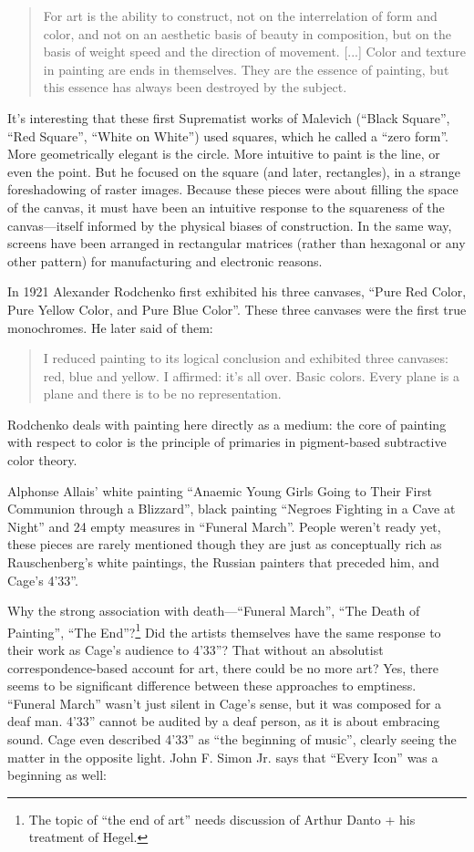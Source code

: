 \documentclass{thesis}
\begin{document}
	\begin{quote}
	For art is the ability to construct, not on the interrelation of form and color, and not on an aesthetic basis of beauty in composition, but on the basis of weight speed and the direction of movement. [...] Color and texture in painting are ends in themselves. They are the essence of painting, but this essence has always been destroyed by the subject.
	\end{quote}
	
It's interesting that these first Suprematist works of Malevich (``Black Square'', ``Red Square'', ``White on White'') used squares, which he called a ``zero form''. More geometrically elegant is the circle. More intuitive to paint is the line, or even the point. But he focused on the square (and later, rectangles), in a strange foreshadowing of raster images. Because these pieces were about filling the space of the canvas, it must have been an intuitive response to the squareness of the canvas---itself informed by the physical biases of construction. In the same way, screens have been arranged in rectangular matrices (rather than hexagonal or any other pattern) for manufacturing and electronic reasons.
	
	\cite{moma_rodchenko_1998}
	In 1921 Alexander Rodchenko first exhibited his three canvases, ``Pure Red Color, Pure Yellow Color, and Pure Blue Color''. These three canvases were the first true monochromes. He later said of them:
	
	\begin{quote}
	I reduced painting to its logical conclusion and exhibited three canvases: red, blue and yellow. I affirmed: it's all over. Basic colors. Every plane is a plane and there is to be no representation.
	\end{quote}
	
Rodchenko deals with painting here directly as a medium: the core of painting with respect to color is the principle of primaries in pigment-based subtractive color theory.
	
Alphonse Allais' white painting ``Anaemic Young Girls Going to Their First Communion through a Blizzard'', black painting ``Negroes Fighting in a Cave at Night'' and 24 empty measures in ``Funeral March''. People weren't ready yet, these pieces are rarely mentioned though they are just as conceptually rich as Rauschenberg's white paintings, the Russian painters that preceded him, and Cage's 4'33''.
	
Why the strong association with death---``Funeral March'', ``The Death of Painting'', ``The End''?\footnote{The topic of ``the end of art'' needs discussion of Arthur Danto + his treatment of Hegel.} Did the artists themselves have the same response to their work as Cage's audience to 4'33''? That without an absolutist correspondence-based account for art, there could be no more art? Yes, there seems to be significant difference between these approaches to emptiness. ``Funeral March'' wasn't just silent in Cage's sense, but it was composed for a deaf man. 4'33'' cannot be audited by a deaf person, as it is about embracing sound. Cage even described 4'33'' as ``the beginning of music'', clearly seeing the matter in the opposite light. John F. Simon Jr. says that ``Every Icon'' was a beginning as well:
	
\end{document}
